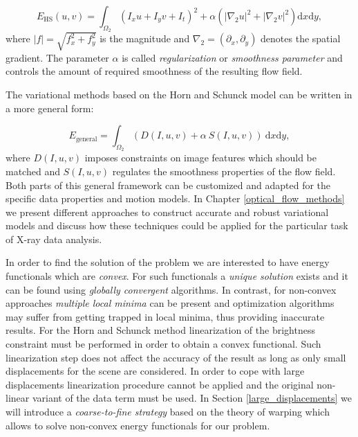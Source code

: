\begin{equation}
E_{\text{HS}}(u,v) = \int_{\Omega_{2}}{(I_{x}u + I_{y}v +I_{t})^2 + \alpha (|\nabla_{2}u|^2 + |\nabla_{2}v|^2) \text{d}x \text{d}y},
\end{equation}
where $|f| = \sqrt{f^2_x + f^2_y}$ is the magnitude and $\nabla_2 = (\partial_{x}, \partial_{y})$ denotes the spatial gradient. The parameter $\alpha$ is called \textit{regularization} or \textit{smoothness parameter} and controls the amount of required smoothness of the resulting flow field. 

The variational \opticalflow methods based on the Horn and Schunck model can be written in a more general form:

$$E_{\text{general}} = \int_{\Omega_2}{(D(I, u,v) + \alpha  \: S(I, u,v)) \: \text{d}x \text{d}y},$$
where $D(I,u,v)$ imposes constraints on image features which should be matched and $S(I, u,v)$ regulates the smoothness properties of the flow field. Both parts of this general \opticalflow framework can be customized and adapted for the specific data properties and motion models. In Chapter \ref{optical_flow_methods} we present different approaches to construct accurate and robust variational \opticalflow models and discuss how these techniques could be applied for the particular task of X-ray data analysis.

In order to find the solution of the \opticalflow problem we are interested to have energy functionals which are \textit{convex}. For such functionals a \textit{unique solution} exists and it can be found using \textit{globally convergent} algorithms. In contrast, for non-convex approaches \textit{multiple local minima} can be present and optimization algorithms may suffer from getting trapped in local minima, thus providing inaccurate results. For the Horn and Schunck method linearization of the brightness constraint must be performed in order to obtain a convex functional. Such linearization step does not affect the accuracy of the result as long as only small displacements for the scene are considered. In order to cope with large displacements linearization procedure cannot be applied and the original non-linear variant of the data term must be used. In Section \ref{large_displacements} we will introduce a \textit{coarse-to-fine strategy} based on the theory of warping which allows to solve non-convex energy functionals for our problem.


 
